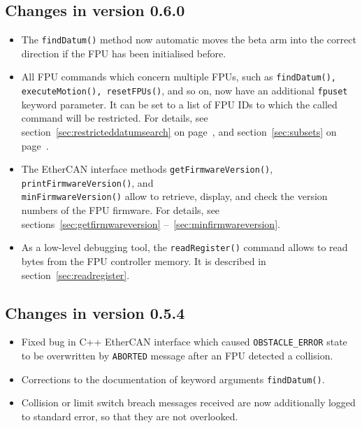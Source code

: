 \documentclass[11pt,a4paper]{scrartcl}
\begin{document}
\subsection*{Changes in version 0.6.0}
\begin{itemize}
\item The \texttt{findDatum()} method now automatic moves the beta
  arm into the correct direction if the FPU has been initialised before.
  
\item All FPU commands which concern multiple FPUs, such as
  \texttt{findDatum(), executeMotion(), resetFPUs()}, and so on, now
  have an additional \texttt{fpuset} keyword parameter. It can be set
  to a list of FPU IDs to which the called command will be
  restricted. For details, see section~\ref{sec:restricteddatumsearch}
  on page~\pageref{sec:restricteddatumsearch}, and
  section~\ref{sec:subsets} on page~\pageref{sec:subsets}.
  
\item The EtherCAN interface methods \texttt{getFirmwareVersion()},
  \texttt{printFirmwareVersion()}, and \\
  \texttt{minFirmwareVersion()}
  allow to retrieve, display, and check the version numbers of the FPU
  firmware. For details, see sections~\ref{sec:getfirmwareversion}
    --~\ref{sec:minfirmwareversion}.

\item As a low-level debugging tool, the \texttt{readRegister()}
  command allows to read bytes from the FPU controller memory.  It is
  described in section~\ref{sec:readregister}.
  
\end{itemize}



\subsection*{Changes in version 0.5.4}
\begin{itemize}
\item Fixed bug in C++ EtherCAN interface which caused \texttt{OBSTACLE\_ERROR}
  state to be overwritten by \texttt{ABORTED} message after an FPU
  detected a collision.
\item Corrections to the documentation of keyword arguments \texttt{findDatum()}.
\item Collision or limit switch breach messages received are now
  additionally logged to standard error, so that they are not overlooked.
\end{itemize}
\end{document}
